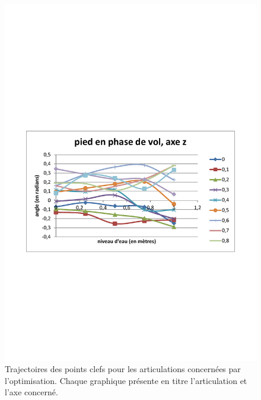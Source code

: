 \documentclass[runningheads,a4paper]{llncs}
\begin{document}
\begin{figure}[h]
\includegraphics[scale=0.3]{traj_pts_clefs/swing_foot_z.pdf}
\caption{Trajectoires des points clefs pour les articulations concernées par l'optimisation. Chaque graphique présente en titre l'articulation et l'axe concerné.}
\label{fig:joint_space_motion_control}
\label{fig:state_machine}
\end{figure}
\end{document}
